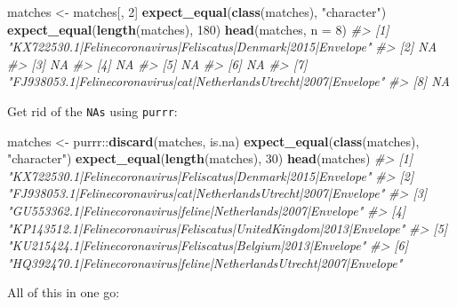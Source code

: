 \documentclass[]{book}
\newenvironment{Shaded}{}{}
\newcommand{\CommentTok}[1]{\textcolor[rgb]{0.38,0.63,0.69}{\textit{#1}}}
\newcommand{\DataTypeTok}[1]{\textcolor[rgb]{0.56,0.13,0.00}{#1}}
\newcommand{\DecValTok}[1]{\textcolor[rgb]{0.25,0.63,0.44}{#1}}
\newcommand{\KeywordTok}[1]{\textcolor[rgb]{0.00,0.44,0.13}{\textbf{#1}}}
\newcommand{\NormalTok}[1]{#1}
\newcommand{\OperatorTok}[1]{\textcolor[rgb]{0.40,0.40,0.40}{#1}}
\newcommand{\StringTok}[1]{\textcolor[rgb]{0.25,0.44,0.63}{#1}}
\begin{document}
\begin{Shaded}
\begin{Highlighting}[]
\NormalTok{matches <-}\StringTok{ }\NormalTok{matches[, }\DecValTok{2}\NormalTok{]}
\KeywordTok{expect_equal}\NormalTok{(}\KeywordTok{class}\NormalTok{(matches), }\StringTok{"character"}\NormalTok{)}
\KeywordTok{expect_equal}\NormalTok{(}\KeywordTok{length}\NormalTok{(matches), }\DecValTok{180}\NormalTok{)}
\KeywordTok{head}\NormalTok{(matches, }\DataTypeTok{n =} \DecValTok{8}\NormalTok{)}
\CommentTok{#> [1] "KX722530.1|Felinecoronavirus|Feliscatus|Denmark|2015|Envelope"    }
\CommentTok{#> [2] NA                                                                 }
\CommentTok{#> [3] NA                                                                 }
\CommentTok{#> [4] NA                                                                 }
\CommentTok{#> [5] NA                                                                 }
\CommentTok{#> [6] NA                                                                 }
\CommentTok{#> [7] "FJ938053.1|Felinecoronavirus|cat|NetherlandsUtrecht|2007|Envelope"}
\CommentTok{#> [8] NA}
\end{Highlighting}
\end{Shaded}

Get rid of the \texttt{NAs} using \texttt{purrr}:

\begin{Shaded}
\begin{Highlighting}[]
\NormalTok{matches <-}\StringTok{ }\NormalTok{purrr}\OperatorTok{::}\KeywordTok{discard}\NormalTok{(matches, is.na)}
\KeywordTok{expect_equal}\NormalTok{(}\KeywordTok{class}\NormalTok{(matches), }\StringTok{"character"}\NormalTok{)}
\KeywordTok{expect_equal}\NormalTok{(}\KeywordTok{length}\NormalTok{(matches), }\DecValTok{30}\NormalTok{)}
\KeywordTok{head}\NormalTok{(matches)}
\CommentTok{#> [1] "KX722530.1|Felinecoronavirus|Feliscatus|Denmark|2015|Envelope"       }
\CommentTok{#> [2] "FJ938053.1|Felinecoronavirus|cat|NetherlandsUtrecht|2007|Envelope"   }
\CommentTok{#> [3] "GU553362.1|Felinecoronavirus|feline|Netherlands|2007|Envelope"       }
\CommentTok{#> [4] "KP143512.1|Felinecoronavirus|Feliscatus|UnitedKingdom|2013|Envelope" }
\CommentTok{#> [5] "KU215424.1|Felinecoronavirus|Feliscatus|Belgium|2013|Envelope"       }
\CommentTok{#> [6] "HQ392470.1|Felinecoronavirus|feline|NetherlandsUtrecht|2007|Envelope"}
\end{Highlighting}
\end{Shaded}

All of this in one go:
\end{document}
